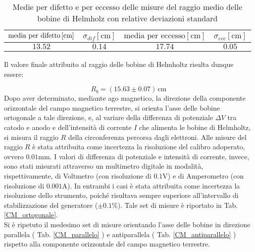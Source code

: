 \documentclass[]{article}
\begin{document}
    \begin{table}[H]
        \centering
    
        \begin{tabular} {||c|c||c|c||}
            \hline
            $ \text{media per difetto\,} [\text{cm}] $ & $\sigma_{dif} [\text{cm}] $ & $ \text{media per eccesso} [\text{cm}] $ & $\sigma_{ecc} [\text{cm}] $\\
            \hline \hline
    
            $ 13.52 $ & $ 0.14 $ & $ 17.74 $ & $ 0.05 $ \\\hline
    
        \end{tabular}
        \caption{Medie per difetto e per eccesso delle misure del raggio medio delle bobine di Helmholz con relative deviazioni standard}
        \label{media_devst_Rb}
    
    \end{table}

    Il valore finale attribuito al raggio delle bobine di Helmholtz risulta dunque essere:

    \begin{equation}
        \label{misura_Rb}
        R_b = (15.63 \pm 0.07) \, \text{cm}
    \end{equation} 
    Dopo aver determinato, mediante ago magnetico, la direzione della componente orizzontale del campo magnetico terrestre, si orienta l'asse delle bobine ortogonale a tale direzione, e, al variare della differenza di potenziale $\Delta V $ tra catodo e anodo e dell'intensità di corrente $I$ che alimenta le bobine di Helmholtz, si misura il raggio $R$ della circonferenza percorsa dagli elettroni. Alle misure del raggio $R$ è stata attribuita come incertezza la risoluzione del calibro adoperato, ovvero $0.01 \text{mm}$. I valori di differenza di potenziale e intensità di corrente, invece, sono stati misurati attraverso un multimetro digitale in modalità, rispettivamente, di Voltmetro (con risoluzione di $0.1 \text{V}$) e di Amperometro (con risoluzione di $0.001 \text{A}$). In entrambi i casi è stata attribuita come incertezza la risoluzione dello strumento, poiché risultava sempre superiore all'intervallo di stabilizzazione del generatore ($\pm 0.1 \%$). Tale set di misure è riportato in Tab. \ref{CM_ortogonale}. \\
    
    Si è ripetuto il medesimo set di misure orientando l'asse delle bobine in direzione parallela ( Tab. \ref{CM_parallelo} ) e antiparallela ( Tab. \ref{CM_antiparallelo} ) rispetto alla componente orizzontale del campo magnetico terrestre.
\end{document}
